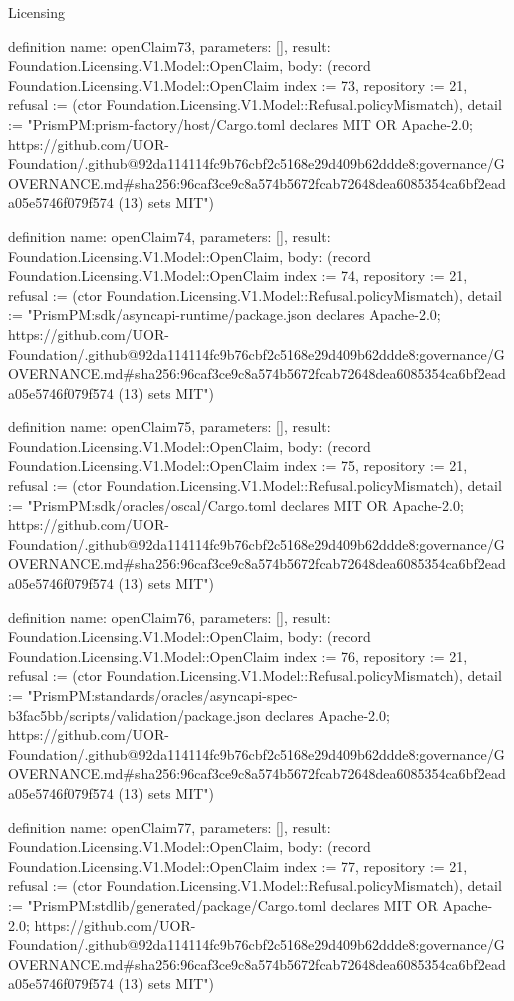 \begin{lexlean}{Licensing}
\begin{semanticmodule}
definition{
  name: openClaim73,
  parameters: [],
  result: Foundation.Licensing.V1.Model::OpenClaim,
  body: (record Foundation.Licensing.V1.Model::OpenClaim {index := 73, repository := 21, refusal := (ctor Foundation.Licensing.V1.Model::Refusal.policyMismatch), detail := "PrismPM:prism-factory/host/Cargo.toml declares MIT OR Apache-2.0; https://github.com/UOR-Foundation/.github@92da114114fc9b76cbf2c5168e29d409b62ddde8:governance/GOVERNANCE.md#sha256:96caf3ce9c8a574b5672fcab72648dea6085354ca6bf2eada05e5746f079f574 (13) sets MIT"})
}

definition{
  name: openClaim74,
  parameters: [],
  result: Foundation.Licensing.V1.Model::OpenClaim,
  body: (record Foundation.Licensing.V1.Model::OpenClaim {index := 74, repository := 21, refusal := (ctor Foundation.Licensing.V1.Model::Refusal.policyMismatch), detail := "PrismPM:sdk/asyncapi-runtime/package.json declares Apache-2.0; https://github.com/UOR-Foundation/.github@92da114114fc9b76cbf2c5168e29d409b62ddde8:governance/GOVERNANCE.md#sha256:96caf3ce9c8a574b5672fcab72648dea6085354ca6bf2eada05e5746f079f574 (13) sets MIT"})
}

definition{
  name: openClaim75,
  parameters: [],
  result: Foundation.Licensing.V1.Model::OpenClaim,
  body: (record Foundation.Licensing.V1.Model::OpenClaim {index := 75, repository := 21, refusal := (ctor Foundation.Licensing.V1.Model::Refusal.policyMismatch), detail := "PrismPM:sdk/oracles/oscal/Cargo.toml declares MIT OR Apache-2.0; https://github.com/UOR-Foundation/.github@92da114114fc9b76cbf2c5168e29d409b62ddde8:governance/GOVERNANCE.md#sha256:96caf3ce9c8a574b5672fcab72648dea6085354ca6bf2eada05e5746f079f574 (13) sets MIT"})
}

definition{
  name: openClaim76,
  parameters: [],
  result: Foundation.Licensing.V1.Model::OpenClaim,
  body: (record Foundation.Licensing.V1.Model::OpenClaim {index := 76, repository := 21, refusal := (ctor Foundation.Licensing.V1.Model::Refusal.policyMismatch), detail := "PrismPM:standards/oracles/asyncapi-spec-b3fac5bb/scripts/validation/package.json declares Apache-2.0; https://github.com/UOR-Foundation/.github@92da114114fc9b76cbf2c5168e29d409b62ddde8:governance/GOVERNANCE.md#sha256:96caf3ce9c8a574b5672fcab72648dea6085354ca6bf2eada05e5746f079f574 (13) sets MIT"})
}

definition{
  name: openClaim77,
  parameters: [],
  result: Foundation.Licensing.V1.Model::OpenClaim,
  body: (record Foundation.Licensing.V1.Model::OpenClaim {index := 77, repository := 21, refusal := (ctor Foundation.Licensing.V1.Model::Refusal.policyMismatch), detail := "PrismPM:stdlib/generated/package/Cargo.toml declares MIT OR Apache-2.0; https://github.com/UOR-Foundation/.github@92da114114fc9b76cbf2c5168e29d409b62ddde8:governance/GOVERNANCE.md#sha256:96caf3ce9c8a574b5672fcab72648dea6085354ca6bf2eada05e5746f079f574 (13) sets MIT"})
}


\end{semanticmodule}
\end{lexlean}
